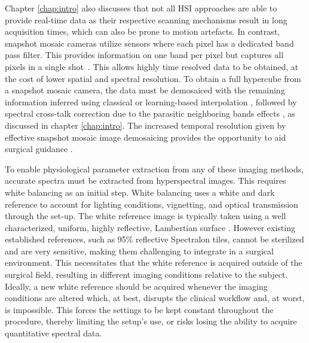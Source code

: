 Chapter \ref{chap:intro} also discusses that not all HSI approaches are able to provide real-time data as their respective scanning mechanisms result in long acquisition times, which can also be prone to motion artefacts. In contrast, snapshot mosaic cameras utilize sensors where each pixel has a dedicated band pass filter. This provides information on one band per pixel but captures all pixels in a single shot~\cite{Geelen2014}. This allows highly time resolved data to be obtained, at the cost of lower spatial and spectral resolution. To obtain a full hypercube from a snapshot mosaic camera, the data must be demosaiced with the remaining information inferred using classical or learning-based interpolation \cite{Li2021}, followed by spectral cross-talk correction due to the parasitic neighboring bands effects \cite{Pichette2017}, as discussed in chapter \ref{chap:intro}. The increased temporal resolution given by effective snapshot mosaic image demosaicing provides the opportunity to aid surgical guidance \cite{Ayala2021, Ebner2021}.

To enable physiological parameter extraction from any of these imaging methods, accurate spectra must be extracted from hyperspectral images. This requires white balancing as an initial step. White balancing uses a white and dark reference to account for lighting conditions, vignetting, and optical transmission through the set-up.
The white reference image is typically taken using a well characterized, uniform, highly reflective, Lambertian surface \cite{Lu2014}.
However existing established references, such as 95\% reflective Spectralon tiles, cannot be sterilized and are very sensitive, making them challenging to integrate in a surgical environment.
This necessitates that the white reference is acquired outside 
%
of the surgical field, resulting in different imaging conditions relative to the subject.
Ideally, a new white reference should be acquired whenever the imaging conditions are altered which, at best, disrupts the clinical workflow and, at worst, is impossible. This forces the settings to be kept constant throughout the procedure, thereby limiting the setup's use, or risks losing the ability to acquire quantitative spectral data. 

